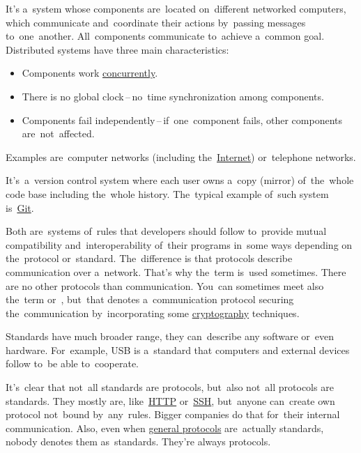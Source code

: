 \label{distributedsystem}
It's a~system whose components are~located on~different networked computers, which communicate and~coordinate their actions by~passing messages to~one~another.
All~components communicate to~achieve a~common goal.
Distributed systems have three main characteristics:
\begin{itemize}
    \item Components work \hyperref[concurrency]{concurrently}.
    \item There is no global clock\,--\,no~time synchronization among components.
    \item Components fail independently\,--\,if~one~component fails, other components are~not~affected.
\end{itemize}
\noindent Examples are~computer networks (including the~\hyperref[internetweb]{Internet}) or~telephone networks.

\label{distributedversioncontrolsystem}
It's~a~version control system where each user owns a~copy (mirror) of~the~whole code base including the~whole history.
The~typical example of~such system is~\hyperref[git]{Git}.

\label{protocolstandard}
Both are~systems of~rules that developers should follow to~provide mutual compatibility and~interoperability of~their programs in~some ways depending on the~protocol or~standard.
The~difference is that protocols describe communication over a~network.
That's why the~term  is~used sometimes.
There are no other protocols than communication.
You~can sometimes meet also the~term  or~, but~that denotes a~communication protocol securing the~communication by~incorporating some \hyperref[cryptography]{cryptography} techniques.

Standards have much broader range, they can~describe any software or~even hardware.
For~example, USB is a~standard that computers and external devices follow to~be able to~cooperate.

\warning It's~clear that not~all standards are protocols, but~also not~all protocols are standards.
They mostly are, like~\hyperref[http]{HTTP} or~\hyperref[ssh]{SSH}, but~anyone can~create own protocol not~bound by~any~rules.
Bigger companies do that for~their internal communication.
Also, even when \hyperref[networkprotocols]{general protocols} are~actually standards, nobody denotes them as~standards.
They're always protocols.

